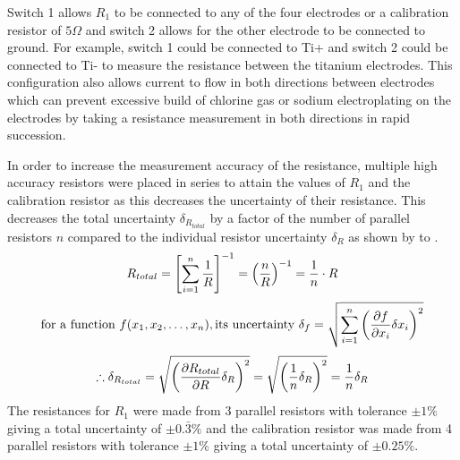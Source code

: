 Switch 1 allows $R_1$ to be connected to any of the four electrodes or a calibration resistor of $5\Omega$ and switch 2 allows for the other electrode to be connected to ground.
For example, switch 1 could be connected to Ti+ and switch 2 could be connected to Ti- to measure the resistance between the titanium electrodes.
This configuration also allows current to flow in both directions between electrodes which can prevent excessive build of chlorine gas or sodium electroplating on the electrodes by taking a resistance measurement in both directions in rapid succession.

In order to increase the measurement accuracy of the resistance, multiple high accuracy resistors were placed in series to attain the values of $R_1$ and the calibration resistor as this decreases the uncertainty of their resistance.
This decreases the total uncertainty $\delta_{R_{total}}$ by a factor of the number of parallel resistors $n$ compared to the individual resistor uncertainty $\delta_R$ as shown by  to .
\begin{equation}[h]\label{eqn:parallel-resistor-total}
    R_{total} = {\left[ \sum_{i=1}^{n} \lfrac{1}{R} \right]}^{-1} = {\left(\lfrac{n}{R}\right)}^{-1} = \lfrac{1}{n}\cdot R
\end{equation}
\begin{equation}[h]\label{eqn:uncertainty-general-formula}
    \text{for a function}~f(x_1,x_2,\dots,x_n), \text{its uncertainty} ~\delta_f = \sqrt{\sum_{i=1}^{n} {\left( \lfrac{\partial f}{\partial x_i} \delta x_i \right)}^2}
\end{equation}
\begin{equation}[h]\label{eqn:parallel-resistor-uncertainty}
    \therefore \delta_{R_{total}} = \sqrt{{\left( \lfrac{\partial R_{total}}{\partial R} \delta_R \right)}^2} = \sqrt{{\left( \lfrac{1}{n} \delta_R \right)}^2} = \lfrac{1}{n} \delta_R
\end{equation}
The resistances for $R_1$ were made from 3 parallel resistors with tolerance $\pm1\%$ giving a total uncertainty of $\pm0.\bar{3}\%$ and the calibration resistor was made from 4 parallel resistors with tolerance $\pm1\%$ giving a total uncertainty of $\pm0.25\%$.

